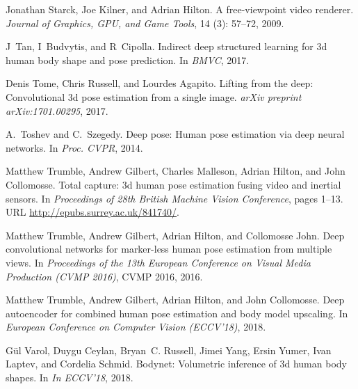 \documentclass{bmvc2k}
\begin{document}
\begin{thebibliography}{47}
Jonathan Starck, Joe Kilner, and Adrian Hilton.
\newblock A free-viewpoint video renderer.
\newblock \emph{Journal of Graphics, GPU, and Game Tools}, 14
  (3): 57--72, 2009.

J~Tan, I~Budvytis, and R~Cipolla.
\newblock Indirect deep structured learning for 3d human body shape and pose
  prediction.
\newblock In \emph{BMVC}, 2017.

Denis Tome, Chris Russell, and Lourdes Agapito.
\newblock Lifting from the deep: Convolutional 3d pose estimation from a single
  image.
\newblock \emph{arXiv preprint arXiv:1701.00295}, 2017.

A.~Toshev and C.~Szegedy.
\newblock Deep pose: Human pose estimation via deep neural networks.
\newblock In \emph{Proc. CVPR}, 2014.

Matthew Trumble, Andrew Gilbert, Charles Malleson, Adrian Hilton, and John
  Collomosse.
\newblock Total capture: 3d human pose estimation fusing video and inertial
  sensors.
\newblock In \emph{Proceedings of 28th British Machine Vision Conference},
  pages 1--13.
\newblock URL \url{http://epubs.surrey.ac.uk/841740/}.

Matthew Trumble, Andrew Gilbert, Adrian Hilton, and Collomosse John.
\newblock Deep convolutional networks for marker-less human pose estimation
  from multiple views.
\newblock In \emph{Proceedings of the 13th European Conference on Visual Media
  Production (CVMP 2016)}, CVMP 2016, 2016.

Matthew Trumble, Andrew Gilbert, Adrian Hilton, and John Collomosse.
\newblock Deep autoencoder for combined human pose estimation and body model
  upscaling.
\newblock In \emph{European Conference on Computer Vision (ECCV'18)}, 2018.

G{\"{u}}l Varol, Duygu Ceylan, Bryan~C. Russell, Jimei Yang, Ersin Yumer, Ivan
  Laptev, and Cordelia Schmid.
\newblock Bodynet: Volumetric inference of 3d human body shapes.
\newblock In \emph{In ECCV'18}, 2018{}.


\end{thebibliography}
\end{document}
